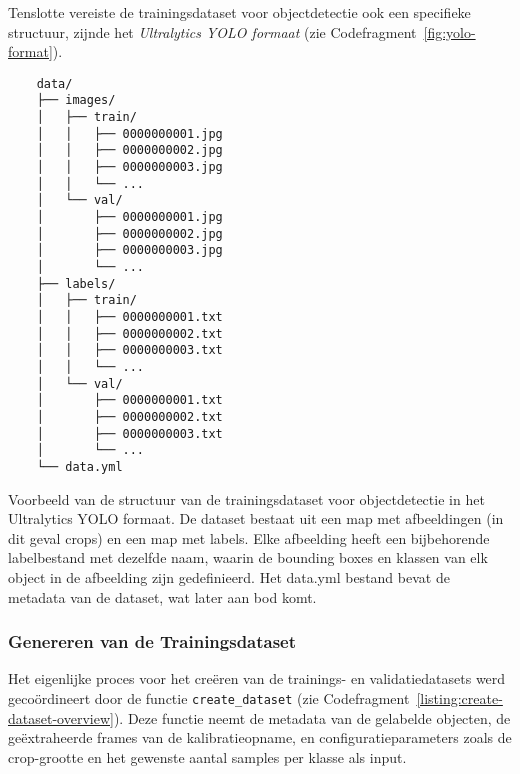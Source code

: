 Tenslotte vereiste de trainingsdataset voor objectdetectie ook een specifieke structuur, zijnde het \textit{Ultralytics YOLO formaat} (zie Codefragment~\ref{fig:yolo-format}).

\begin{listing}[H]
  \begin{verbatim}
    data/
    ├── images/
    │   ├── train/
    │   │   ├── 0000000001.jpg
    │   │   ├── 0000000002.jpg
    │   │   ├── 0000000003.jpg
    │   │   └── ...
    │   └── val/
    │       ├── 0000000001.jpg
    │       ├── 0000000002.jpg
    │       ├── 0000000003.jpg
    │       └── ...
    ├── labels/
    │   ├── train/
    │   │   ├── 0000000001.txt
    │   │   ├── 0000000002.txt
    │   │   ├── 0000000003.txt
    │   │   └── ...
    │   └── val/
    │       ├── 0000000001.txt
    │       ├── 0000000002.txt
    │       ├── 0000000003.txt
    │       └── ...
    └── data.yml
  \end{verbatim}
  \caption[Voorbeeld van het Ultralytics YOLO Formaat]{
    \label{fig:yolo-format}
    Voorbeeld van de structuur van de trainingsdataset voor objectdetectie in het Ultralytics YOLO formaat.
    De dataset bestaat uit een map met afbeeldingen (in dit geval crops) en een map met labels.
    Elke afbeelding heeft een bijbehorende labelbestand met dezelfde naam, waarin de bounding boxes en klassen van elk object in de afbeelding zijn gedefinieerd.
    Het data.yml bestand bevat de metadata van de dataset, wat later aan bod komt.
  }
\end{listing}

\subsubsection{Genereren van de Trainingsdataset}

Het eigenlijke proces voor het creëren van de trainings- en validatiedatasets werd gecoördineert door de functie \texttt{create\_dataset} 
(zie Codefragment~\ref{listing:create-dataset-overview}). 
Deze functie neemt de metadata van de gelabelde objecten, de geëxtraheerde frames van de kalibratieopname, 
en configuratieparameters zoals de crop-grootte en het gewenste aantal samples per klasse als input.

